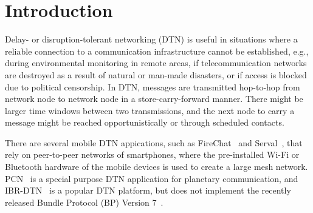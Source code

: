 \section{Introduction}
\label{penning2019dtn7:sec:intro}

Delay- or disruption-tolerant networking (DTN) is useful in situations where a reliable connection to a communication infrastructure cannot be established, e.g., during environmental monitoring in remote areas, if telecommunication networks are destroyed as a result of natural or man-made disasters, or 
if access is blocked due to political censorship. In DTN, messages are transmitted hop-to-hop from network node to network node in a store-carry-forward manner. 
There might be larger time windows between two transmissions, and the next node to carry a message might be reached opportunistically or through scheduled contacts.

There are several mobile DTN appications, such as FireChat~\cite{garden2015firechat} and Serval~\cite{gardner2011serval}, that rely on peer-to-peer networks of smartphones, where
the pre-installed Wi-Fi or Bluetooth hardware of the mobile devices is used to create a large mesh network.
{\textmu}PCN~\cite{feldmann2015upcn} is a special purpose DTN application for planetary communication, and IBR-DTN~\cite{doering2008ibr} is a popular DTN platform, but does not implement the recently released Bundle Protocol (BP) Version 7~\cite{dtn_bp7v13}.


